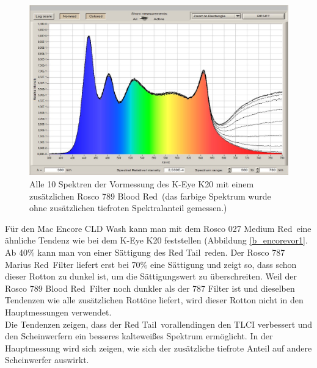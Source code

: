 \begin{figure}[H]     %
\centering
\includegraphics[width=1.0\textwidth]{bilder/keyevor3} 
\caption {Alle 10 Spektren der Vormessung des K-Eye K20 mit einem zusätzlichen  Rosco 789 \glqq Blood Red\grqq\ (das farbige Spektrum wurde ohne zusätzlichen tiefroten Spektralanteil gemessen.)}\label{b_keyevor3}
\end{figure}

Für den Mac Encore CLD Wash kann man mit dem Rosco 027 \glqq Medium Red\grqq\ eine ähnliche Tendenz wie bei dem K-Eye K20 feststellen (Abbildung \ref{b_encorevor1}. Ab 40\% kann man von einer Sättigung des \glqq Red Tail\grqq\ reden. Der Rosco 787 \glqq Marius Red\grqq\ Filter liefert erst bei 70\% eine Sättigung und zeigt so, dass schon dieser Rotton zu dunkel ist, um die Sättigungswert zu überschreiten. Weil der Rosco 789 \glqq Blood Red\grqq\ Filter noch dunkler als der 787 Filter ist und dieselben Tendenzen wie alle zusätzlichen Rottöne liefert, wird dieser Rotton nicht in den Hauptmessungen verwendet. \\
Die Tendenzen zeigen, dass der \glqq Red Tail\grqq\ vorallendingen den TLCI verbessert und den Scheinwerfern ein besseres kalteweißes Spektrum ermöglicht. In der Hauptmessung wird sich zeigen, wie sich der zusätzliche tiefrote Anteil auf andere Scheinwerfer auswirkt.

